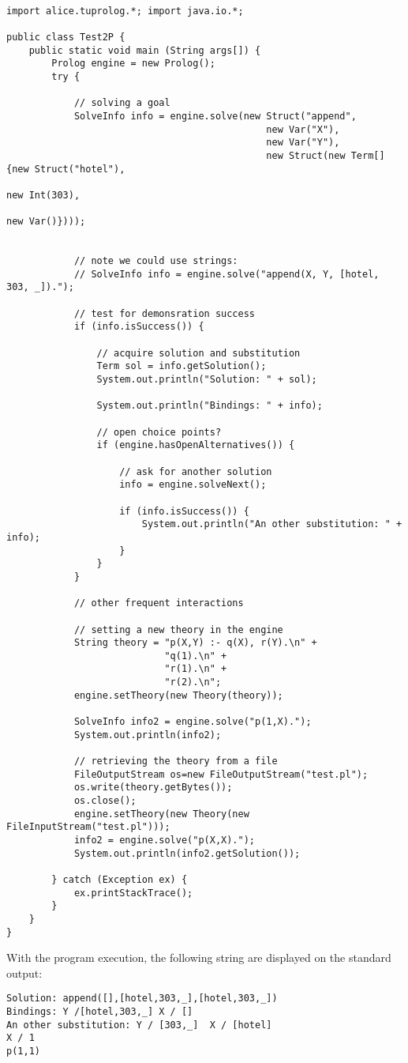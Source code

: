 {\tt\scriptsize{\begin{verbatim}

import alice.tuprolog.*; import java.io.*;

public class Test2P {
    public static void main (String args[]) {
        Prolog engine = new Prolog();
        try {

            // solving a goal
            SolveInfo info = engine.solve(new Struct("append",
                                              new Var("X"),
                                              new Var("Y"),
                                              new Struct(new Term[]{new Struct("hotel"),
                                                                    new Int(303),
                                                                    new Var()})));


            // note we could use strings:
            // SolveInfo info = engine.solve("append(X, Y, [hotel, 303, _]).");

            // test for demonsration success
            if (info.isSuccess()) {

                // acquire solution and substitution
                Term sol = info.getSolution();
                System.out.println("Solution: " + sol);

                System.out.println("Bindings: " + info);

                // open choice points?
                if (engine.hasOpenAlternatives()) {

                    // ask for another solution
                    info = engine.solveNext();

                    if (info.isSuccess()) {
                        System.out.println("An other substitution: " + info);
                    }
                }
            }

            // other frequent interactions

            // setting a new theory in the engine
            String theory = "p(X,Y) :- q(X), r(Y).\n" +
                            "q(1).\n" +
                            "r(1).\n" +
                            "r(2).\n";
            engine.setTheory(new Theory(theory));

            SolveInfo info2 = engine.solve("p(1,X).");
            System.out.println(info2);

            // retrieving the theory from a file
            FileOutputStream os=new FileOutputStream("test.pl");
            os.write(theory.getBytes());
            os.close();
            engine.setTheory(new Theory(new FileInputStream("test.pl")));
            info2 = engine.solve("p(X,X).");
            System.out.println(info2.getSolution());

        } catch (Exception ex) {
            ex.printStackTrace();
        }
    }
}
\end{verbatim}}}

With the program execution, the following string are displayed on
the standard output:

{\tt\small{

\begin{verbatim}
Solution: append([],[hotel,303,_],[hotel,303,_])
Bindings: Y /[hotel,303,_] X / []
An other substitution: Y / [303,_]  X / [hotel]
X / 1
p(1,1)
\end{verbatim}}} 